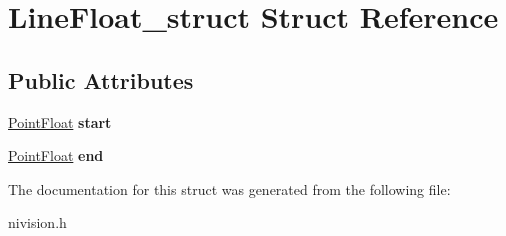 \hypertarget{structLineFloat__struct}{\section{\-Line\-Float\-\_\-struct \-Struct \-Reference}
\label{structLineFloat__struct}
}
\subsection*{\-Public \-Attributes}
\begin{DoxyCompactItemize}
\item 
\hypertarget{structLineFloat__struct_a10e78867a8f8e9c0d39cf12ac0fae9c3}{\hyperlink{structPointFloat__struct}{\-Point\-Float} {\bfseries start}}\label{structLineFloat__struct_a10e78867a8f8e9c0d39cf12ac0fae9c3}

\item 
\hypertarget{structLineFloat__struct_a90fcc40c1d2c12c382f0a7c055b12de7}{\hyperlink{structPointFloat__struct}{\-Point\-Float} {\bfseries end}}\label{structLineFloat__struct_a90fcc40c1d2c12c382f0a7c055b12de7}

\end{DoxyCompactItemize}


\-The documentation for this struct was generated from the following file\-:\begin{DoxyCompactItemize}
\item 
nivision.\-h\end{DoxyCompactItemize}
